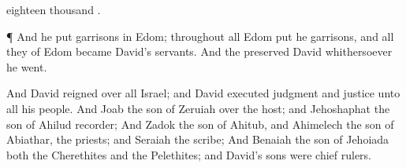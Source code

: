 {eighteen
thousand
{}.
\par }{\PP {}¶ And he
put
garrisons in
Edom; throughout all
Edom
put he
garrisons, and all they of
Edom became
David’s
servants. And the
{}
preserved
David whithersoever he
went.
\par }{\PP {}And
David
reigned over all
Israel; and
David
executed
judgment and
justice unto all his
people.
And
Joab the
son of
Zeruiah
{} over the
host; and
Jehoshaphat the
son of
Ahilud
{}
recorder;
And
Zadok the
son of
Ahitub, and
Ahimelech the
son of
Abiathar,
{} the
priests; and
Seraiah
{} the
scribe;
And
Benaiah the
son of
Jehoiada
{} both the
Cherethites and the
Pelethites; and
David’s
sons were chief
rulers.

}

